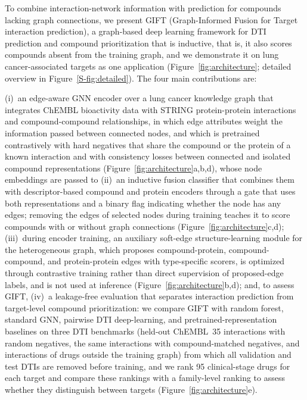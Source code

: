 \documentclass[10pt,letterpaper]{article}
\begin{document}
To combine interaction-network information with prediction for compounds lacking graph connections, we present GIFT (Graph-Informed Fusion for Target interaction prediction), a graph-based deep learning framework for DTI prediction and compound prioritization that is inductive, that is, it also scores compounds absent from the training graph, and we demonstrate it on lung cancer-associated targets as one application (Figure~\ref{fig:architecture}; detailed overview in Figure~\ref{S-fig:detailed}). The four main contributions are:

(i)~an edge-aware GNN encoder over a lung cancer knowledge graph that integrates ChEMBL bioactivity data with STRING protein-protein interactions and compound-compound relationships, in which edge attributes weight the information passed between connected nodes, and which is pretrained contrastively with hard negatives that share the compound or the protein of a known interaction and with consistency losses between connected and isolated compound representations (Figure~\ref{fig:architecture}a,b,d), whose node embeddings are passed to
(ii)~an inductive fusion classifier that combines them with descriptor-based compound and protein encoders through a gate that uses both representations and a binary flag indicating whether the node has any edges; removing the edges of selected nodes during training teaches it to score compounds with or without graph connections (Figure~\ref{fig:architecture}c,d);
(iii)~during encoder training, an auxiliary soft-edge structure-learning module for the heterogeneous graph, which proposes compound-protein, compound-compound, and protein-protein edges with type-specific scorers, is optimized through contrastive training rather than direct supervision of proposed-edge labels, and is not used at inference (Figure~\ref{fig:architecture}b,d); and, to assess GIFT,
(iv)~a leakage-free evaluation that separates interaction prediction from target-level compound prioritization: we compare GIFT with random forest, standard GNN, pairwise DTI deep-learning, and pretrained-representation baselines on three DTI benchmarks (held-out ChEMBL~35 interactions with random negatives, the same interactions with compound-matched negatives, and interactions of drugs outside the training graph) from which all validation and test DTIs are removed before training, and we rank 95 clinical-stage drugs for each target and compare these rankings with a family-level ranking to assess whether they distinguish between targets (Figure~\ref{fig:architecture}e).
\end{document}
